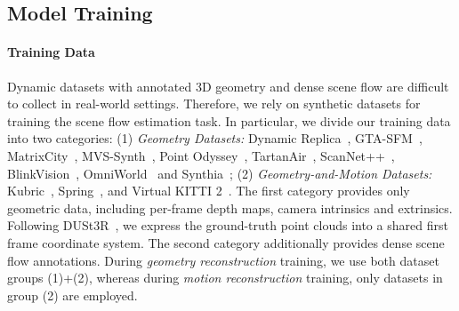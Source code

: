 \subsection{Model Training}
\label{sec:method_training}

\paragraph{Training Data}
Dynamic datasets with annotated 3D geometry and dense scene flow are difficult to collect in real-world settings.
Therefore,
we rely on synthetic datasets for training the scene flow estimation task.
In particular,
we divide our training data into two categories:
(1) \emph{Geometry Datasets:}
Dynamic Replica~\cite{karaev2023dynamicstereo},
GTA-SFM~\cite{wang2020gtasfm},
MatrixCity~\cite{li2023matrixcity},
MVS-Synth~\cite{huang2018deepmvs},
Point Odyssey~\cite{zheng2023pointodyssey},
TartanAir~\cite{wang2020tartanair},
ScanNet++~\cite{yeshwanth2023scannet++},
BlinkVision~\cite{li2024blinkvision},
OmniWorld~\cite{zhou2025omniworld}
and Synthia~\cite{ros2016synthia};
(2) \emph{Geometry-and-Motion Datasets:}
Kubric~\cite{greff2021kubric},
Spring~\cite{Mehl2023_Spring},
and Virtual KITTI 2~\cite{cabon2020virtual}.
The first category provides only geometric data,
including per-frame depth maps,
camera intrinsics and extrinsics.
Following DUSt3R~\cite{wang2024dust3r},
we express the ground-truth point clouds into a shared first frame coordinate system.
The second category additionally provides dense scene flow annotations.
During \textit{geometry reconstruction} training,
we use both dataset groups (1)+(2),
whereas during \textit{motion reconstruction} training,
only datasets in group (2) are employed.

